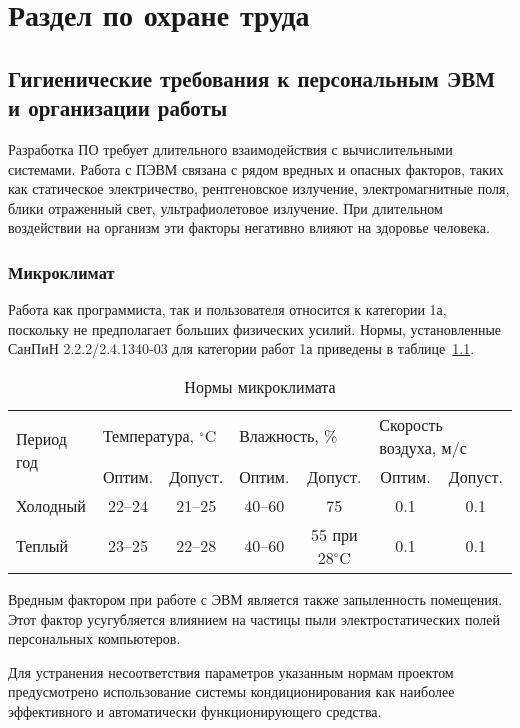\chapter{Раздел по охране труда}

\section{Гигиенические требования к персональным ЭВМ и организации работы}

Разработка ПО требует длительного взаимодействия с вычислительными системами. Работа с ПЭВМ связана с рядом вредных и опасных факторов, таких как статическое электричество, рентгеновское излучение, электромагнитные поля, блики отраженный свет, ультрафиолетовое излучение. При длительном воздействии на организм эти факторы негативно влияют на здоровье человека.

\subsection{Микроклимат}

Работа как программиста, так и пользователя относится к категории 1а, поскольку не предполагает больших физических усилий. Нормы, установленные СанПиН 2.2.2/2.4.1340-03 для категории работ 1а приведены в таблице~\ref{tab:microclimate}.

\begin{table}[ht]
\caption{Нормы микроклимата}
\begin{tabular}{|l|c|c|c|c|c|c|}
\hline
\multirow{2}{*}{Период год} & \multicolumn{2}{l|}{Температура, $^\circ \mbox{C}$} & \multicolumn{2}{l|}{Влажность, \%} & \multicolumn{2}{l|}{Скорость воздуха, м/с} \\
\cline{2-7}
&Оптим.&Допуст.&Оптим.&Допуст.&Оптим.&Допуст.\\
\hline
Холодный &22--24&21--25&40--60&75&0.1&0.1\\
\hline
Теплый &23--25&22--28&40--60&55 при 28$^\circ \mbox{C}$&0.1&0.1\\
\hline 
\end{tabular}
\label{tab:microclimate}
\end{table}

Вредным фактором при работе с ЭВМ является также запыленность помещения. Этот фактор усугубляется влиянием на частицы пыли электростатических полей персональных компьютеров.

Для устранения несоответствия параметров указанным нормам проектом предусмотрено использование системы кондиционирования как наиболее эффективного и автоматически функционирующего средства.

